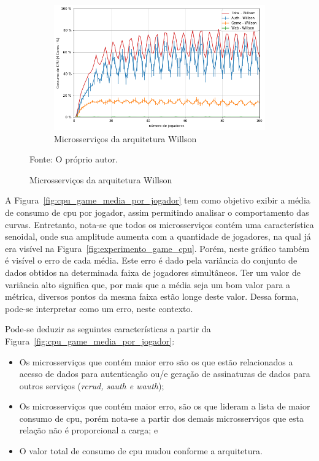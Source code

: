 \begin{figure}[htb!]
    \begin{subfigure}{0.5\textwidth}
        \centering
        \includegraphics[width=.95\linewidth]{figuras/analise/cpu_w_arch_media_por_jogador.png}
        \caption{Microsserviços da arquitetura Willson}
        \label{fig:cpu_w_arch_media_por_jogador}
    \end{subfigure}%

    Fonte: O próprio autor.
\end{figure}

A Figura~\ref{fig:cpu_game_media_por_jogador} tem como objetivo exibir a média de consumo de \ac{cpu} por jogador, assim permitindo analisar o comportamento das curvas.
%
Entretanto, nota-se que todos os microsserviços contém uma característica senoidal, onde sua amplitude aumenta com a quantidade de jogadores, na qual já era visível na Figura~\ref{fig:experimento_game_cpu}.
%
Porém, neste gráfico também é visível o erro de cada média.
%
Este erro é dado pela variância do conjunto de dados obtidos na determinada faixa de jogadores simultâneos.
%
Ter um valor de variância alto significa que, por mais que a média seja um bom valor para a métrica, diversos pontos da mesma faixa estão longe deste valor.
%
Dessa forma, pode-se interpretar como um erro, neste contexto.

Pode-se deduzir as seguintes características a partir da Figura~\ref{fig:cpu_game_media_por_jogador}:

\begin{itemize}
 \item Os microsserviços que contém maior erro são os que estão relacionados a acesso de dados para autenticação ou/e geração de assinaturas de dados para outros serviços (\textit{rcrud, sauth e wauth});
 \item Os microsserviços que contém maior erro, são os que lideram a lista de maior consumo de \ac{cpu}, porém nota-se a partir dos demais microsserviços que esta relação não é proporcional a carga; e
 \item O valor total de consumo de \ac{cpu} mudou conforme a arquitetura.
\end{itemize}

